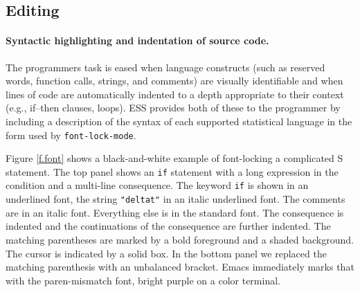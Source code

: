 \documentclass{article}
\newcommand{\stexttt}[1]{{\small\texttt{#1}}}
\begin{document}
\subsection{Editing}
\label{sec:ESS:features}

\paragraph{Syntactic highlighting and indentation of source code.}
The programmers task is eased when language constructs (such as
reserved words, function calls, strings, and comments) are visually
identifiable and when lines of code are automatically indented to a
depth appropriate to their context (e.g., if--then clauses, loops).
ESS provides both of these to the programmer by including a
description of the syntax of each supported statistical language in
the form used by \stexttt{font-lock-mode}.


Figure \ref{f.font} shows a black-and-white example of font-locking a
complicated S statement.  The top panel shows an \stexttt{if}
statement with a long expression in the condition and a multi-line
consequence.  The keyword \stexttt{if} is shown in an underlined font,
the string \stexttt{"deltat"} in an italic underlined font.  The
comments are in an italic font.  Everything else is in the standard
font.  The consequence is indented and the continuations of the
consequence are further indented.  The matching parentheses are marked
by a bold foreground and a shaded background.  The cursor is indicated
by a solid box.  In the bottom panel we replaced the matching
parenthesis with an unbalanced bracket.  Emacs immediately marks that
with the paren-mismatch font, bright purple on a color terminal.
\end{document}
